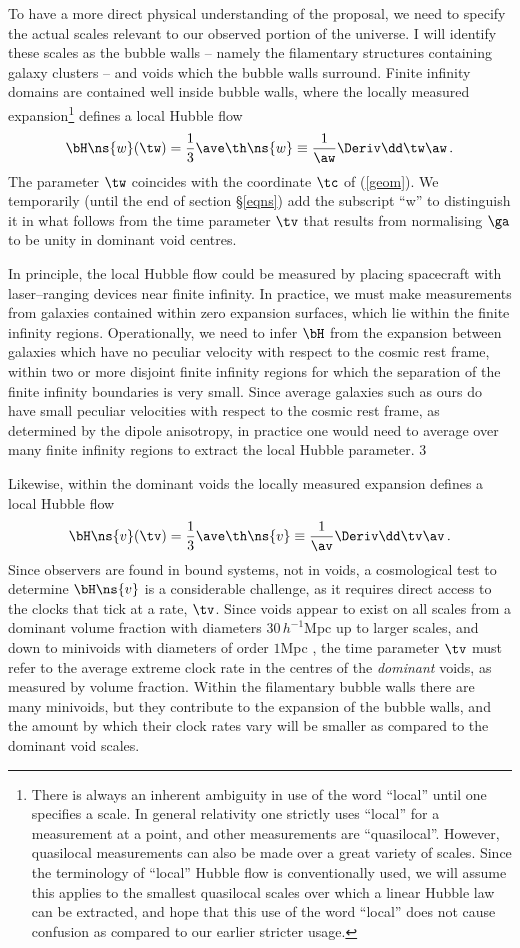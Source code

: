 \documentclass[12pt]{iopart}
\begin{document}
To have a more direct physical understanding of the proposal, we need to
specify the actual scales relevant to our observed portion of the universe.
I will identify these scales as the bubble walls -- namely the filamentary
structures containing galaxy clusters -- and voids which the bubble
walls surround. Finite infinity domains are contained well inside bubble
walls, where the locally measured expansion\footnote{There is always
an inherent ambiguity in use of the word ``local'' until one specifies a
scale. In general relativity one strictly uses ``local'' for a measurement
at a point, and other measurements are ``quasilocal''. However, quasilocal
measurements can also be made over a great variety of scales. Since
the terminology of ``local'' Hubble flow is conventionally used, we will
assume this applies to the smallest quasilocal scales over which a linear
Hubble law can be extracted, and hope that this use of the word ``local''
does not cause confusion as compared to our earlier stricter usage.}
defines a local Hubble flow
$$
\bH\ns{w}(\tw)=\frac13\ave\th\ns{w}\equiv{1\over\aw}\Deriv\dd\tw\aw\,.
$$
The parameter $\tw$ coincides with the coordinate $\tc$ of (\ref{geom}).
We temporarily (until the end of section \S\ref{eqns}) add the subscript
``w'' to distinguish it in what follows from the time parameter $\tv$ that
results from normalising $\ga$ to be unity in dominant void centres.

In principle, the local Hubble flow could be measured by placing spacecraft
with laser--ranging devices near finite infinity. In practice, we must make
measurements from galaxies contained within zero expansion surfaces, which lie
within the finite infinity regions. Operationally, we need to infer $\bH$ from
the expansion between galaxies which have no peculiar velocity with respect to
the cosmic rest frame, within two or more disjoint finite infinity
regions for which the separation of the finite infinity boundaries is very
small. Since average galaxies such as ours do have small peculiar
velocities with respect to the cosmic rest frame, as determined by the
dipole anisotropy, in practice one would need to average over many finite
infinity regions to extract the local Hubble parameter.
\setcounter{footnote}3

Likewise, within the dominant voids the locally measured expansion defines a
local Hubble flow
$$
\bH\ns{v}(\tv)=\frac13\ave\th\ns{v}\equiv{1\over\av}\Deriv\dd\tv\av\,.
$$
Since observers are found in bound systems, not in voids, a cosmological
test to determine $\bH\ns{v}$ is a considerable challenge, as it requires
direct access to the clocks that tick at a rate, $\tv$. Since
voids appear to exist on all scales from a dominant volume fraction with
diameters $30\,h^{-1}$Mpc up to larger scales, and down to minivoids with
diameters of order $1$Mpc \cite{minivoids}, the time parameter $\tv$ must refer
to the average extreme clock rate in the centres of the {\em dominant} voids,
as measured by volume fraction. Within the filamentary bubble walls there
are many minivoids, but they contribute to the expansion of the bubble
walls, and the amount by which their clock rates vary will be smaller
as compared to the dominant void scales.
\end{document}

